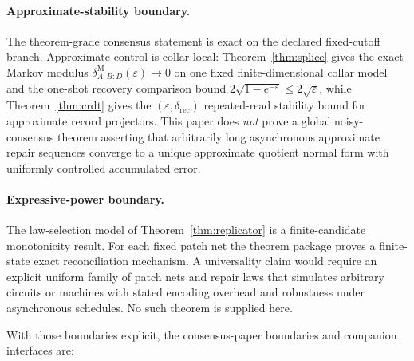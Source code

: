 \documentclass[11pt]{article}
\theoremstyle{remark}
\theoremstyle{plain}
\begin{document}
\paragraph{Approximate-stability boundary.}
The theorem-grade consensus statement is exact on the declared fixed-cutoff branch. Approximate
control is collar-local: Theorem~\ref{thm:splice} gives the exact-Markov modulus
\(\delta^{\mathrm M}_{A:B:D}(\varepsilon)\to0\) on one fixed finite-dimensional collar model and
the one-shot recovery comparison bound \(2\sqrt{1-e^{-\varepsilon}}\le 2\sqrt{\varepsilon}\),
while Theorem~\ref{thm:crdt} gives the \((\varepsilon,\delta_{\mathrm{rec}})\) repeated-read
stability bound for approximate record projectors. This paper does \emph{not} prove a
global noisy-consensus theorem asserting that arbitrarily long asynchronous approximate repair
sequences converge to a unique approximate quotient normal form with uniformly controlled
accumulated error.

\paragraph{Expressive-power boundary.}
The law-selection model of Theorem~\ref{thm:replicator} is a finite-candidate monotonicity result.
For each fixed patch net the theorem package proves a finite-state exact reconciliation
mechanism. A universality claim would require an explicit uniform family of patch nets and repair laws that
simulates arbitrary circuits or machines with stated encoding overhead and robustness under
asynchronous schedules. No such theorem is supplied here.

With those boundaries explicit, the consensus-paper boundaries and companion interfaces are:
\end{document}
